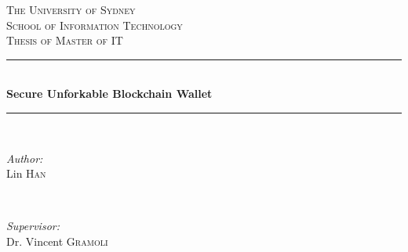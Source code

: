 \documentclass[12pt]{article}
\begin{document}
\begin{titlepage}

\newcommand{\HRule}{\rule{\linewidth}{0.5mm}} %

\center %
 

\textsc{\LARGE The University of Sydney}\\[1.5cm] %
\textsc{\Large School of Information Technology}\\[0.5cm] %
\textsc{\large Thesis of Master of IT}\\[0.5cm] %


\HRule \\[0.6cm]
{ \huge \bfseries Secure Unforkable Blockchain Wallet}\\[0.4cm] %
\HRule \\[1.6cm]
 

\begin{minipage}{0.4\textwidth}
\begin{flushleft} \large
\emph{Author:}\\
Lin \textsc{Han} %
\end{flushleft}
\end{minipage}
~
\begin{minipage}{0.4\textwidth}
\begin{flushright} \large
\emph{Supervisor:} \\
Dr. Vincent \textsc{Gramoli} %
\end{flushright}
\end{minipage}\\[2cm]



\end{titlepage}
\end{document}
